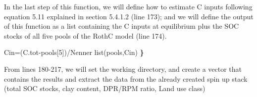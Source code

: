\documentclass[
  10pt,
  b5paper,
]{book}
\newenvironment{Shaded}{\begin{snugshade}}{\end{snugshade}}
\newcommand{\DecValTok}[1]{\textcolor[rgb]{0.00,0.00,0.81}{#1}}
\newcommand{\ErrorTok}[1]{\textcolor[rgb]{0.64,0.00,0.00}{\textbf{#1}}}
\newcommand{\FunctionTok}[1]{\textcolor[rgb]{0.00,0.00,0.00}{#1}}
\newcommand{\NormalTok}[1]{#1}
\newcommand{\OtherTok}[1]{\textcolor[rgb]{0.56,0.35,0.01}{#1}}
\newcommand{\SpecialCharTok}[1]{\textcolor[rgb]{0.00,0.00,0.00}{#1}}
\begin{document}
In the last step of this function, we will define how to estimate C inputs following equation 5.11 explained in section 5.4.1.2 (line 173); and we will define the output of this function as a list containing the C inputs at equilibrium plus the SOC stocks of all five pools of the RothC model (line 174).

\begin{Shaded}
\begin{Highlighting}[]
\NormalTok{Cin}\OtherTok{=}\NormalTok{(C.tot}\SpecialCharTok{{-}}\NormalTok{pools[}\DecValTok{5}\NormalTok{])}\SpecialCharTok{/}\NormalTok{Nenner}
  \FunctionTok{list}\NormalTok{(pools,Cin)}
\ErrorTok{\}}
\end{Highlighting}
\end{Shaded}

From lines 180-217, we will set the working directory, and create a vector that contains the results and extract the data from the already created spin up stack (total SOC stocks, clay content, DPR/RPM ratio, Land use class)
\end{document}
